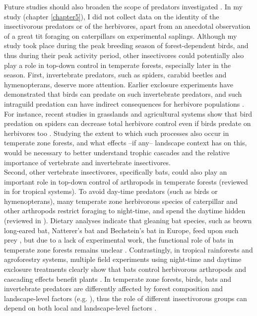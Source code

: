 \documentclass[10pt, twoside]{book} %
\begin{document}
Future studies should also broaden the scope of predators investigated \citep{Vidal2018}. In my study (chapter \ref{chapter5}), I did not collect data on the identity of the insectivorous predators or of the herbivores, apart from an anecdotal observation of a great tit foraging on caterpillars on experimental saplings. Although my study took place during the peak breeding season of forest-dependent birds, and thus during their peak activity period, other insectivores could potentially also play a role in top-down control in temperate forests, especially later in the season. First, invertebrate predators, such as spiders, carabid beetles and hymenopterans, deserve more attention. Earlier exclosure experiments have demonstrated that birds can predate on such invertebrate predators, and such intraguild predation can have indirect consequences for herbivore populations \citep{Polis1992}. For instance, recent studies in grasslands and agricultural systems show that bird predation on spiders can decrease total herbivore control even if birds predate on herbivores too \citep{Bosc2018, Grass2017}. Studying the extent to which such processes also occur in temperate zone forests, and what effects --if any-- landscape context has on this, would be necessary to better understand trophic cascades and the relative importance of vertebrate and invertebrate insectivores.\\

Second, other vertebrate insectivores, specifically bats, could also play an important role in top-down control of arthropods in temperate forests (reviewed in \citealt{Maas2016} for tropical systems). To avoid day-time predators (such as birds or hymenopterans), many temperate zone herbivorous species of caterpillar and other arthropods restrict foraging to night-time, and spend the daytime hidden (reviewed in \citealt{Heinrich1979}). Dietary analyses indicate that gleaning bat species, such as brown long-eared bat, Natterer's bat and Bechstein's bat in Europe, feed upon such prey \citep{Wolz2013, Hope2014}, but due to a lack of experimental work, the functional role of bats in temperate zone forests remains unclear \citep{Russo2016}. Contrastingly, in tropical rainforests and agroforestry systems, multiple field experiments using night-time and daytime exclosure treatments clearly show that bats control herbivorous arthropods and cascading effects benefit plants \citep{Kalka2008, Williams-Guillen2008, Maas2013}. In temperate zone forests, birds, bats and invertebrate predators are differently affected by forest composition and landscape-level factors (e.g. \citealt{Penone2019}), thus the role of different insectivorous groups can depend on both local and landscape-level factors \citep{Maas2016}.\\
\end{document}
